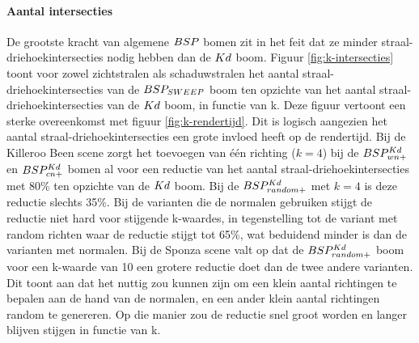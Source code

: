 \paragraph{Aantal intersecties}
De grootste kracht van algemene $BSP$ bomen zit in het feit dat ze minder straal-driehoekintersecties nodig hebben dan de $Kd$ boom.
Figuur \ref{fig:k-intersecties} toont voor zowel zichtstralen als schaduwstralen het aantal straal-driehoekintersecties van de $BSP_{SWEEP}$ boom ten opzichte van het aantal straal-driehoekintersecties van de $Kd$ boom, in functie van k.
Deze figuur vertoont een sterke overeenkomst met figuur \ref{fig:k-rendertijd}. 
Dit is logisch aangezien het aantal straal-driehoekintersecties een grote invloed heeft op de rendertijd.
Bij de Killeroo Been scene zorgt het toevoegen van één richting ($k = 4$) bij de $BSP^{Kd}_{wn+}$ en $BSP^{Kd}_{cn+}$ bomen al voor een reductie van het aantal straal-driehoekintersecties met 80\% ten opzichte van de $Kd$ boom. Bij de $BSP^{Kd}_{random+}$ met $k = 4$ is deze reductie slechts 35\%. Bij de varianten die de normalen gebruiken stijgt de reductie niet hard voor stijgende k-waardes, in tegenstelling tot de variant met random richten waar de reductie stijgt tot 65\%, wat beduidend minder is dan de varianten met normalen.
Bij de Sponza scene valt op dat de $BSP^{Kd}_{random+}$ boom voor een k-waarde van 10 een grotere reductie doet dan de twee andere varianten.
Dit toont aan dat het nuttig zou kunnen zijn om een klein aantal richtingen te bepalen aan de hand van de normalen, en een ander klein aantal richtingen random te genereren. Op die manier zou de reductie snel groot worden en langer blijven stijgen in functie van k.

